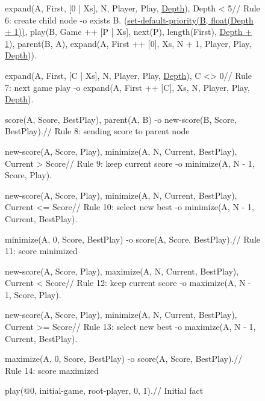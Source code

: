 \begin{figure}[]
\begin{LineCode}[commandchars=\\\{\},fontsize=\scriptsize]
expand(A, First, [0 | Xs], N, Player, Play, \underline{Depth}), Depth < 5\label{line:coord:minimax_rule41}\hfill// Rule 6: create child node
  -o exists B. (\underline{set-default-priority(B, float(Depth + 1))},\label{line:coord:minimax_coord3}
       play(B, Game ++ [P | Xs], next(P), length(First), \underline{Depth + 1}), parent(B, A),
       expand(A, First ++ [0], Xs, N + 1, Player, Play, \underline{Depth})).\label{line:coord:minimax_rule42}

expand(A, First, [C | Xs], N, Player, Play, \underline{Depth}), C <> 0\label{line:coord:minimax_expand11}\label{line:coord:minimax_rule51}\hfill// Rule 7: next game play
  -o expand(A, First ++ [C], Xs, N, Player, Play, \underline{Depth}).\label{line:coord:minimax_expand2}\label{line:coord:minimax_rule52}

score(A, Score, BestPlay), parent(A, B) -o new-score(B, Score, BestPlay).\label{line:coord:minimax_new}\hfill// Rule 8: sending score to parent node

new-score(A, Score, Play), minimize(A, N, Current, BestPlay), Current > Score\label{line:coord:minimax_minimize1}\hfill// Rule 9: keep current score
   -o minimize(A, N - 1, Score, Play).

new-score(A, Score, Play), minimize(A, N, Current, BestPlay), Current <= Score\hfill// Rule 10: select new best
   -o minimize(A, N - 1, Current, BestPlay).

minimize(A, 0, Score, BestPlay) -o score(A, Score, BestPlay).\label{line:coord:minimax_minimize2}// Rule 11: score minimized

new-score(A, Score, Play), maximize(A, N, Current, BestPlay), Current < Score\label{line:coord:minimax_maximize1}\label{line:coord:minimax_maximize_rule11}\hfill// Rule 12: keep current score
   -o maximize(A, N - 1, Score, Play).\label{line:coord:minimax_maximize_rule12}

new-score(A, Score, Play), minimize(A, N, Current, BestPlay), Current >= Score\label{line:coord:minimax_maximize_rule21}\hfill// Rule 13: select new best
   -o maximize(A, N - 1, Current, BestPlay).\label{line:coord:minimax_maximize_rule22}

maximize(A, 0, Score, BestPlay) -o score(A, Score, BestPlay).\label{line:coord:minimax_maximize2}\hfill// Rule 14: score maximized

play(@0, initial-game, root-player, 0, 1).\label{line:coord:minimax_axiom}\hfill// Initial fact
\end{LineCode}
\label{code:coord:minimax}
\end{figure}

